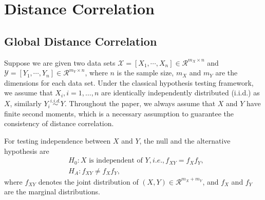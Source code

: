 \documentclass[12pt]{article}
\begin{document}

\section{Distance Correlation}
\label{main}
\subsection{Global Distance Correlation}
\label{main1}
Suppose we are given two data sets $\mathcal{X}=[X_{1},\cdots, X_{n}] \in \mathcal{R}^{m_{X} \times n}$ and $\mathcal{Y}=[Y_{1},\cdots, Y_{n}] \in \mathcal{R}^{m_{Y} \times n}$, where $n$ is the sample size, $m_{X}$ and $m_{Y}$ are the dimensions for each data set. Under the classical hypothesis testing framework, we assume that $X_{i}, i=1,\ldots,n$ are identically independently distributed (i.i.d.) as $X$, similarly $Y_{i} \stackrel{i.i.d.}{\sim} Y$. Throughout the paper, we always assume that $X$ and $Y$ have finite second moments, which is a necessary assumption to guarantee the consistency of distance correlation.

For testing independence between $X$ and $Y$, the null and the alternative hypothesis are
\begin{align*}
& H_{0}: X \mbox{ is independent of } Y, i.e., f_{XY}=f_{X}f_{Y},\\
& H_{A}: f_{XY} \neq f_{X}f_{Y},
\end{align*}
where $f_{XY}$ denotes the joint distribution of $(X,Y) \in \mathcal{R}^{m_{X}+m_{Y}}$, and $f_{X}$ and $f_{Y}$ are the marginal distributions. 
\end{document}
